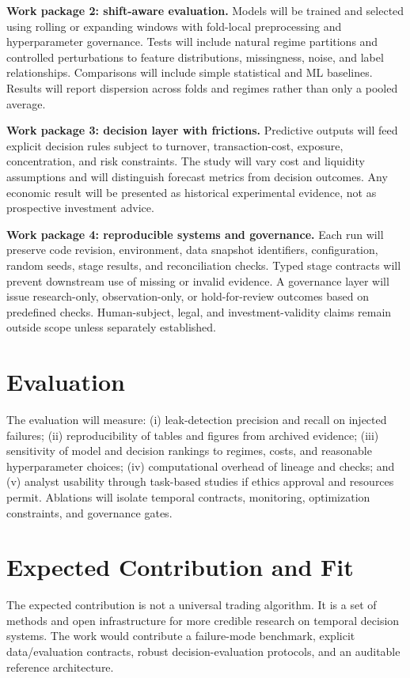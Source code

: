 \documentclass[11pt]{article}
\begin{document}
\textbf{Work package 2: shift-aware evaluation.} Models will be trained and selected using rolling or expanding windows with fold-local preprocessing and hyperparameter governance. Tests will include natural regime partitions and controlled perturbations to feature distributions, missingness, noise, and label relationships. Comparisons will include simple statistical and ML baselines. Results will report dispersion across folds and regimes rather than only a pooled average.

\textbf{Work package 3: decision layer with frictions.} Predictive outputs will feed explicit decision rules subject to turnover, transaction-cost, exposure, concentration, and risk constraints. The study will vary cost and liquidity assumptions and will distinguish forecast metrics from decision outcomes. Any economic result will be presented as historical experimental evidence, not as prospective investment advice.

\textbf{Work package 4: reproducible systems and governance.} Each run will preserve code revision, environment, data snapshot identifiers, configuration, random seeds, stage results, and reconciliation checks. Typed stage contracts will prevent downstream use of missing or invalid evidence. A governance layer will issue research-only, observation-only, or hold-for-review outcomes based on predefined checks. Human-subject, legal, and investment-validity claims remain outside scope unless separately established.

\section*{Evaluation}
The evaluation will measure: (i) leak-detection precision and recall on injected failures; (ii) reproducibility of tables and figures from archived evidence; (iii) sensitivity of model and decision rankings to regimes, costs, and reasonable hyperparameter choices; (iv) computational overhead of lineage and checks; and (v) analyst usability through task-based studies if ethics approval and resources permit. Ablations will isolate temporal contracts, monitoring, optimization constraints, and governance gates.

\section*{Expected Contribution and Fit}
The expected contribution is not a universal trading algorithm. It is a set of methods and open infrastructure for more credible research on temporal decision systems. The work would contribute a failure-mode benchmark, explicit data/evaluation contracts, robust decision-evaluation protocols, and an auditable reference architecture.
\end{document}
